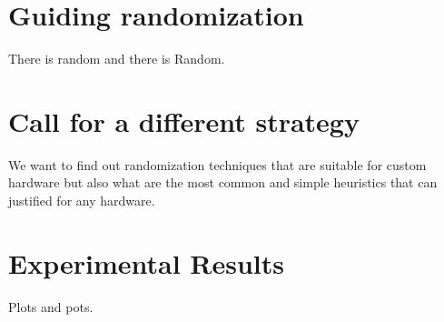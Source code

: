 \documentclass[manuscript,screen]{acmart}
\begin{document}
\section{Guiding randomization}
\label{sec:guide}
There is random and there is Random.


\section{Call for a different strategy}
\label{sec:strategy}
We want to find out randomization techniques that are suitable for
custom hardware but also what are the most common and simple
heuristics that can justified for any hardware.


\section{Experimental Results}
\label{sec:experimentalresults}
Plots and pots.




%

 

%
\end{document}
